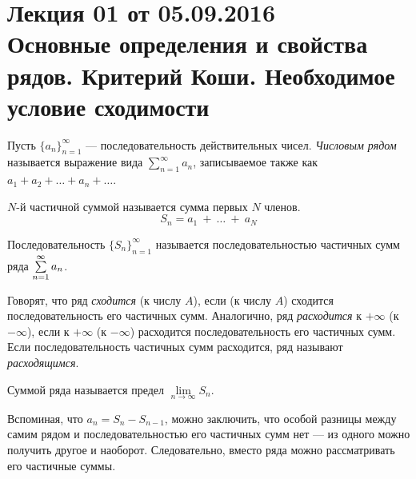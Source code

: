 \documentclass[a4paper, 12pt]{article}
\begin{document}
\pagestyle{fancy}
\section{Лекция 01 от 05.09.2016 \\ Основные определения и свойства рядов. Критерий Коши. Необходимое условие сходимости}
\begin{Def}
	Пусть \(\{a_n\}^{\infty}_{n=1}\) --- последовательность действительных чисел. \emph{Числовым рядом} называется выражение вида \(\sum\limits_{n=1}^{\infty}a_n\), записываемое также как \(a_1 + a_2 + \ldots + a_n + \ldots \).
	
\end{Def}
\begin{Def}
	\(N\)-й частичной суммой называется сумма первых \(N\) членов. 
	$$S_n = a_1~+~\ldots~+~a_N$$
\end{Def}

\begin{Def}
	Последовательность \(\{S_n\}^{\infty}_{n=1}\)
	называется последовательностью частичных сумм ряда $\sum\limits_{n=1}^{\infty}a_n$.
\end{Def}

Говорят, что ряд \textit{сходится} (к числу $A$), если (к числу $A$) сходится последовательность его частичных сумм. Аналогично, ряд \textit{расходится} к $+\infty$ (к $-\infty$), если к $+\infty$ (к $-\infty$) расходится последовательность его частичных сумм. Если последовательность частичных сумм расходится, ряд называют \textit{расходящимся}.

\begin{Def}
Суммой ряда называется предел $\lim\limits_{n \to \infty} S_n$.
\end{Def}
Вспоминая, что $a_n = S_{n} - S_{n-1}$, можно заключить, что особой разницы между самим рядом и последовательностью его частичных сумм нет --- из одного можно получить другое и наоборот. Следовательно, вместо ряда можно рассматривать его частичные суммы.
\end{document}

